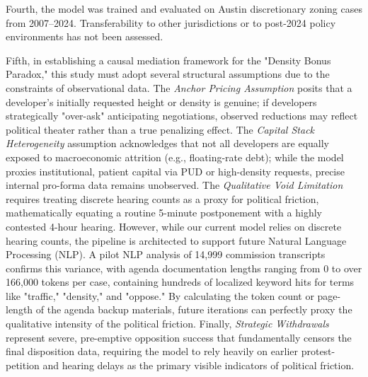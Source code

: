 Fourth, the model was trained and evaluated on Austin discretionary zoning cases from 2007--2024. Transferability to other jurisdictions or to post-2024 policy environments has not been assessed.

Fifth, in establishing a causal mediation framework for the "Density Bonus Paradox," this study must adopt several structural assumptions due to the constraints of observational data. The \textit{Anchor Pricing Assumption} posits that a developer's initially requested height or density is genuine; if developers strategically "over-ask" anticipating negotiations, observed reductions may reflect political theater rather than a true penalizing effect. The \textit{Capital Stack Heterogeneity} assumption acknowledges that not all developers are equally exposed to macroeconomic attrition (e.g., floating-rate debt); while the model proxies institutional, patient capital via PUD or high-density requests, precise internal pro-forma data remains unobserved. The \textit{Qualitative Void Limitation} requires treating discrete hearing counts as a proxy for political friction, mathematically equating a routine 5-minute postponement with a highly contested 4-hour hearing. However, while our current model relies on discrete hearing counts, the pipeline is architected to support future Natural Language Processing (NLP). A pilot NLP analysis of 14,999 commission transcripts confirms this variance, with agenda documentation lengths ranging from 0 to over 166,000 tokens per case, containing hundreds of localized keyword hits for terms like "traffic," "density," and "oppose." By calculating the token count or page-length of the agenda backup materials, future iterations can perfectly proxy the qualitative intensity of the political friction. Finally, \textit{Strategic Withdrawals} represent severe, pre-emptive opposition success that fundamentally censors the final disposition data, requiring the model to rely heavily on earlier protest-petition and hearing delays as the primary visible indicators of political friction.

